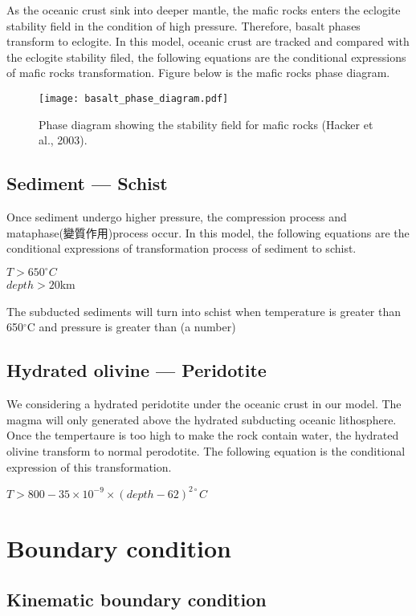 As the oceanic crust sink into deeper mantle, the mafic rocks enters the eclogite stability field in the condition of high pressure. 
Therefore, basalt phases transform to eclogite.  
In this model, oceanic crust are tracked and compared with the eclogite stability filed, the following equations are the conditional expressions of mafic rocks transformation. 
Figure below is the mafic rocks phase diagram.
\begin{figure*}[ht!]
    \centering
    \texttt{[image: basalt\_phase\_diagram.pdf]}
    \caption{ Phase diagram showing the stability field for mafic rocks (Hacker et al., 2003).  }
    \label{fig::elastic}
\end{figure*}

\subsection{Sediment --- Schist}

Once sediment undergo higher pressure, the compression process and mataphase(變質作用)process occur.
In this model, the following equations are the conditional expressions of transformation process of sediment to schist.

$T > 650^{\circ} C$\\
$depth >  20 $km 

The subducted sediments will turn into schist when temperature is greater than 650$^\circ$C and pressure is greater than (a number)

\subsection{Hydrated olivine --- Peridotite}

We considering a hydrated peridotite under the oceanic crust in our model. 
The magma will only generated above the hydrated subducting oceanic lithosphere.
Once the tempertaure is too high to make the rock contain water, the hydrated olivine transform to normal perodotite.
The following equation is the conditional expression of this transformation.

$T > 800-35\times 10^{-9}\times (depth-62)^{2\circ}C$

\section{Boundary condition}

\subsection{Kinematic boundary condition}

